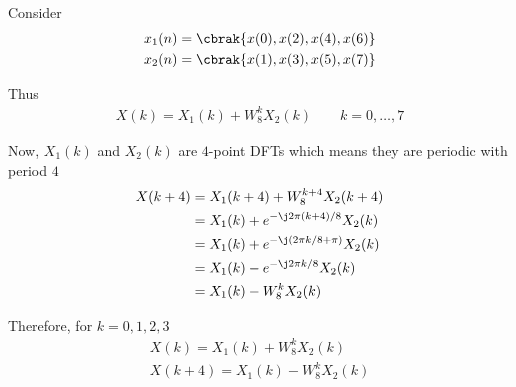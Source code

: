 \documentclass[journal,12pt,twocolumn]{IEEEtran}
\renewcommand\thesection{\arabic{section}}
\begin{document}
\begin{enumerate}[label=\arabic*.,ref=\thesection.\theenumi]
    Consider
    \begin{align}
    		x_1(n) = \cbrak{x(0), x(2), x(4), x(6)} \\
    		x_2(n) = \cbrak{x(1), x(3), x(5), x(7)}
    \end{align}
    
    Thus
    \begin{align}
    		X(k) = X_1(k) + W_8^k X_2(k) \qquad k = 0,\ldots,7
    \end{align}
    
    Now, $X_1(k)$ and $X_2(k)$ are $4$-point DFTs which means they are periodic with period $4$
    \begin{align}
    		X(k+4) &= X_1(k+4) + W_8^{k+4} X_2(k+4) \\
    		&= X_1(k) + e^{-\j 2\pi(k+4)/8} X_2(k) \\
    		&= X_1(k) + e^{-\j (2\pi k/8 + \pi)} X_2(k) \\
    		&= X_1(k) - e^{-\j 2\pi k/8 } X_2(k) \\
    		&= X_1(k) - W_8^k X_2(k)
    \end{align}
    
    Therefore, for $k=0,1,2,3$
    \begin{align}
    		X(k) = X_1(k) + W_8^k X_2(k)  \\
    		X(k+4) = X_1(k) - W_8^k X_2(k) 
    \end{align}
    

\end{enumerate}
\end{document}
